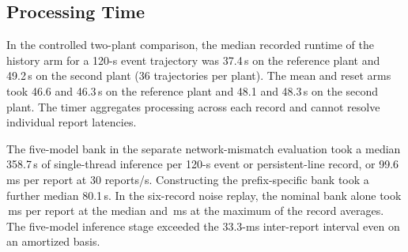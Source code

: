 \subsection{Processing Time}
In the controlled two-plant comparison, the median recorded runtime
of the history arm for a 120-s event trajectory was 37.4\,s on the reference plant
and 49.2\,s on the second plant (36 trajectories per plant). The mean and reset
arms took 46.6 and 46.3\,s on the reference plant and 48.1 and 48.3\,s on the second plant.
The timer aggregates processing across each record and cannot resolve
individual report latencies.

The five-model bank in the separate network-mismatch evaluation took
a median 358.7\,s of single-thread inference per 120-s event or
persistent-line record, or 99.6\,ms per report at 30 reports/s.
Constructing the prefix-specific bank took a further median 80.1\,s.
In the six-record noise replay, the nominal bank alone took
\RevNomMsReport{}\,ms per report at the median and
\RevNomMsReportMax{}\,ms at the maximum of the record averages.
The five-model inference stage exceeded the 33.3-ms inter-report
interval even on an amortized basis.
